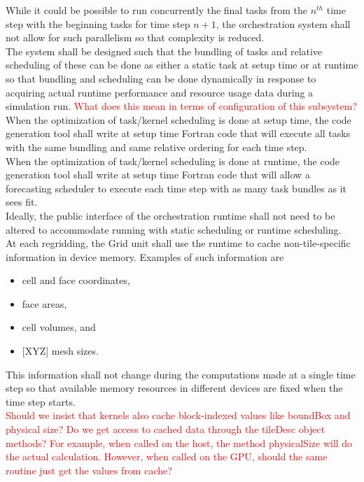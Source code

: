 \documentclass{article}
\begin{document}
While it could be possible to run concurrently the final tasks from the $n^{th}$
time step with the beginning tasks for time step $n+1$, the orchestration
system shall not allow for such parallelism so that complexity is reduced.\\ 

The system shall be designed such that the bundling of tasks and relative
scheduling of these can be done as either a static task at setup time or at
runtime so that bundling and scheduling can be done dynamically in response to
acquiring actual runtime performance and resource usage data during a simulation
run.  \textcolor{red}{What does this mean in terms of configuration of this
subsystem?}\\

When the optimization of task/kernel scheduling is done at setup time, the 
code generation tool shall write at setup time Fortran code that will execute
all tasks with the same bundling and same relative ordering for each time
step.\\

When the optimization of task/kernel scheduling is done at runtime, the 
code generation tool shall write at setup time Fortran code that will allow a
forecasting scheduler to execute each time step with as many task bundles as it
sees fit.\\

Ideally, the public interface of the orchestration runtime shall not need to be
altered to accommodate running with static scheduling or runtime scheduling.\\

At each regridding, the Grid unit shall use the runtime to cache
non-tile-specific information in device memory.  Examples of such information
are
\begin{itemize}
\item{cell and face coordinates,}
\item{face areas, }
\item{cell volumes, and}
\item{[XYZ] mesh sizes.}
\end{itemize}
This information shall not change during the computations made at a single time
step so that available memory resources in different devices are fixed when the
time step starts.\\

\textcolor{red}{Should we insist that kernels also cache block-indexed values
like boundBox and physical size?  Do we get access to cached data through the
tileDesc object methods?  For example, when called on the host, the method
physicalSize will do the actual calculation.  However, when called on the GPU,
should the same routine just get the values from cache?}\\
\end{document}
